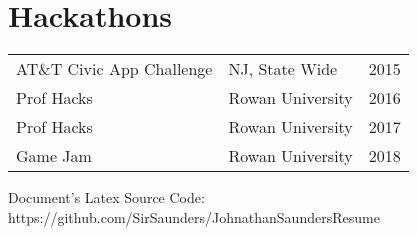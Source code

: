 \documentclass[]{johns_resume_style}
\begin{document}
\begin{minipage}[t]{0.68\textwidth}
\section{Hackathons} 


\begin{tabular}{p{5cm}p{5cm}p{5cm}}
AT\&T Civic App Challenge  & NJ, State Wide  &   2015 \\  
Prof Hacks	     & Rowan University  & 2016\\
Prof Hacks	     & Rowan University  & 2017\\
Game Jam         & Rowan University  & 2018

 
\end{tabular}
\sectionsep


\end{minipage} 
\vspace*{-.8cm}
\centering
Document's Latex Source Code: https://github.com/SirSaunders/JohnathanSaundersResume
\end{document}
